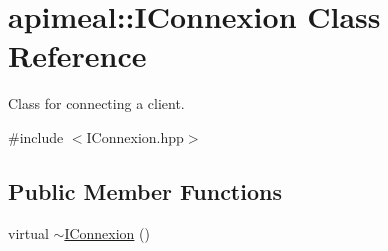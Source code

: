 \hypertarget{classapimeal_1_1IConnexion}{\section{apimeal\-:\-:I\-Connexion Class Reference}
\label{classapimeal_1_1IConnexion}
}


Class for connecting a client.  




{\ttfamily \#include $<$I\-Connexion.\-hpp$>$}

\subsection*{Public Member Functions}
\begin{DoxyCompactItemize}
\item 
\hypertarget{classapimeal_1_1IConnexion_afa1d85aeadc451143eef2837d5ea4939}{virtual \hyperlink{classapimeal_1_1IConnexion_afa1d85aeadc451143eef2837d5ea4939}{$\sim$\-I\-Connexion} ()}\label{classapimeal_1_1IConnexion_afa1d85aeadc451143eef2837d5ea4939}


\end{DoxyCompactItemize}
